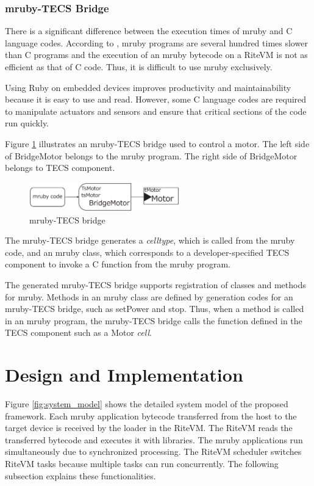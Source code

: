 \documentclass[S,R,E]{article/compsoft}
\begin{document}
\subsubsection{mruby-TECS Bridge}
There is a significant difference between the execution times of mruby and C language codes.
According to  \cite{par:mrubyonTECS}, mruby programs are several hundred times slower than C programs and the execution of an mruby bytecode on a RiteVM is not as efficient as that of C code.
Thus, it is difficult to use mruby exclusively.

Using Ruby on embedded devices improves productivity and maintainability because it is easy to use and read.
However, some C language codes are required to manipulate actuators and sensors and ensure that critical sections of the code run quickly.

Figure \ref{fig:mruby_TECS_bridge} illustrates an mruby-TECS bridge used to control a motor.
The left side of BridgeMotor belongs to the mruby program.
The right side of BridgeMotor belongs to TECS component.
\begin{figure}[t]
    \centering
    \includegraphics[width=6.5cm,clip]{figure/mruby_TECS_bridge.eps}
\caption{mruby-TECS bridge}
\label{fig:mruby_TECS_bridge}
\end{figure}

The mruby-TECS bridge generates a {\it celltype}, which is called from the mruby code, and an mruby class, which corresponds to a developer-specified TECS component to invoke a C function from the mruby program.

The generated mruby-TECS bridge supports registration of classes and methods for mruby.
Methods in an mruby class are defined by generation codes for an mruby-TECS bridge, such as setPower and stop.
Thus, when a method is called in an mruby program, the mruby-TECS bridge calls the function defined in the TECS component such as a Motor {\it cell}.

\section{Design and Implementation}
\label{sec:Design and Implementation}
Figure \ref{fig:system_model} shows the detailed system model of the proposed framework.
Each mruby application bytecode transferred from the host to the target device is received by the loader in the RiteVM.
The RiteVM reads the transferred bytecode and executes it with libraries.
The mruby applications run simultaneously due to synchronized processing.
The RiteVM scheduler switches RiteVM tasks because multiple tasks can run concurrently.
The following subsection explains these functionalities.
\end{document}
